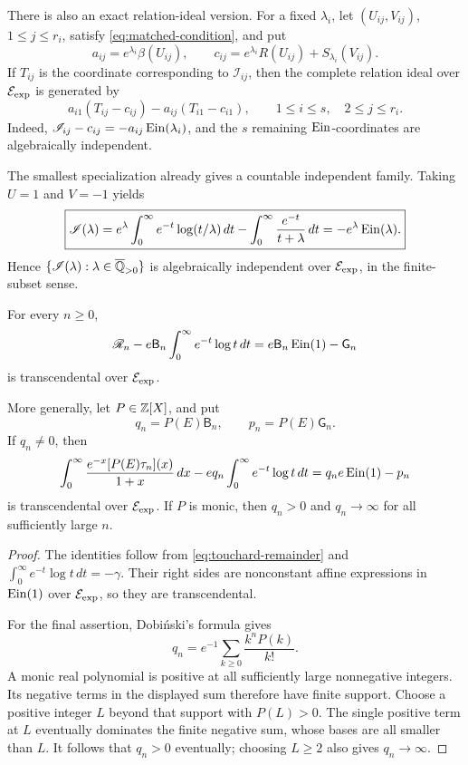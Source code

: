 There is also an exact relation-ideal version.  For a fixed \(\lambda_i\),
let \((U_{ij},V_{ij})\), \(1\leq j\leq r_i\), satisfy
\eqref{eq:matched-condition}, and put
\[
 a_{ij}=e^{\lambda_i}\beta(U_{ij}),
 \qquad
 c_{ij}=e^{\lambda_i}R(U_{ij})+S_{\lambda_i}(V_{ij}).
\]
If \(T_{ij}\) is the coordinate corresponding to
\(\mathscr I_{ij}\), then the complete relation ideal over \(\mathcal E_{\mathrm{exp}}\) is
generated by
\begin{equation}\label{eq:matched-full-ideal}
 a_{i1}(T_{ij}-c_{ij})
 -a_{ij}(T_{i1}-c_{i1}),
 \qquad
 1\leq i\leq s,\quad 2\leq j\leq r_i.
\end{equation}
Indeed, \(\mathscr I_{ij}-c_{ij}=-a_{ij}\operatorname{Ein}(\lambda_i)\), and the
\(s\) remaining \(\operatorname{Ein}\)-coordinates are algebraically independent.

The smallest specialization already gives a countable independent family.
Taking \(U=1\) and \(V=-1\) yields
\begin{equation}\label{eq:minimal-matched-integral}
 \boxed{
 \mathscr I(\lambda)
 =e^\lambda\int_0^\infty e^{-t}\log(t/\lambda)\,dt
 -\int_0^\infty\frac{e^{-t}}{t+\lambda}\,dt
 =-e^\lambda\operatorname{Ein}(\lambda).}
\end{equation}
Hence
\(\{\mathscr I(\lambda):\lambda\in\overline{\mathbb Q}_{>0}\}\) is algebraically
independent over \(\mathcal E_{\mathrm{exp}}\), in the finite-subset sense.

\begin{corollary}
\label{cor:filtered-touchard-transcendence}
For every \(n\geq0\),
\begin{equation}\label{eq:paired-touchard}
 \mathscr R_n-e\mathsf B_n
 \int_0^\infty e^{-t}\log t\,dt
 =e\mathsf B_n\operatorname{Ein}(1)-\mathsf G_n
\end{equation}
is transcendental over \(\mathcal E_{\mathrm{exp}}\).

More generally, let \(P\in\mathbb Z[X]\), and put
\[
 q_n=P(E)\mathsf B_n,
 \qquad p_n=P(E)\mathsf G_n.
\]
If \(q_n\ne0\), then
\begin{equation}\label{eq:paired-filtered-touchard}
 \int_0^\infty
 \frac{e^{-x}[P(E)\tau_n](x)}{1+x}\,dx
 -eq_n\int_0^\infty e^{-t}\log t\,dt
 =q_ne\operatorname{Ein}(1)-p_n
\end{equation}
is transcendental over \(\mathcal E_{\mathrm{exp}}\).
If \(P\) is monic, then \(q_n>0\) and \(q_n\to\infty\) for all
sufficiently large \(n\).
\end{corollary}

\begin{proof}
The identities follow from \eqref{eq:touchard-remainder} and
\(\int_0^\infty e^{-t}\log t\,dt=-\gamma\).  Their right sides are
nonconstant affine expressions in \(\operatorname{Ein}(1)\) over \(\mathcal E_{\mathrm{exp}}\), so they are
transcendental.

For the final assertion, Dobi\'nski's formula gives
\[
 q_n=e^{-1}\sum_{k\geq0}\frac{k^nP(k)}{k!}.
\]
A monic real polynomial is positive at all sufficiently large nonnegative
integers.  Its negative terms in the displayed sum therefore have finite
support.  Choose a positive integer \(L\) beyond that support with
\(P(L)>0\).  The single positive term at \(L\) eventually dominates the
finite negative sum, whose bases are all smaller than \(L\).  It follows
that \(q_n>0\) eventually; choosing \(L\geq2\) also gives \(q_n\to\infty\).
\end{proof}

